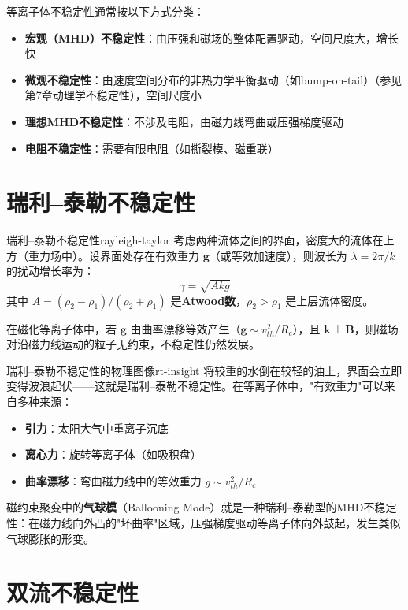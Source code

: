\documentclass[12pt,a4paper,openany,oneside]{book}
\newcommand{\vect}[1]{\bm{#1}}
\newcommand{\difficulty}[1]{\marginnote{\hfill\textcolor{coverMid!80}{\rule[-0.1em]{2pt}{0.9em}}\,\textcolor{coverMid}{\footnotesize\textbf{[#1]}}}}
\begin{document}
等离子体不稳定性通常按以下方式分类：
\begin{itemize}
\item \textbf{宏观（MHD）不稳定性}：由压强和磁场的整体配置驱动，空间尺度大，增长快
\item \textbf{微观不稳定性}：由速度空间分布的非热力学平衡驱动（如bump-on-tail）（参见第7章动理学不稳定性），空间尺度小
\item \textbf{理想MHD不稳定性}：不涉及电阻，由磁力线弯曲或压强梯度驱动
\item \textbf{电阻不稳定性}：需要有限电阻（如撕裂模、磁重联）
\end{itemize}

\section{瑞利--泰勒不稳定性}\difficulty{提高}

\begin{theorem}{瑞利--泰勒不稳定性}{rayleigh-taylor}
考虑两种流体之间的界面，密度大的流体在上方（重力场中）。设界面处存在有效重力 $\vect{g}$（或等效加速度），则波长为 $\lambda = 2\pi/k$ 的扰动增长率为：
\[
\gamma = \sqrt{A k g}
\]
其中 $A = (\rho_2 - \rho_1)/(\rho_2 + \rho_1)$ 是\textbf{Atwood数}，$\rho_2 > \rho_1$ 是上层流体密度。

在磁化等离子体中，若 $\vect{g}$ 由曲率漂移等效产生（$\vect{g} \sim v_{th}^2/R_c$），且 $\vect{k}\perp\vect{B}$，则磁场对沿磁力线运动的粒子无约束，不稳定性仍然发展。
\end{theorem}

\begin{insight}{瑞利--泰勒不稳定性的物理图像}{rt-insight}
将较重的水倒在较轻的油上，界面会立即变得波浪起伏——这就是瑞利--泰勒不稳定性。在等离子体中，"有效重力"可以来自多种来源：
\begin{itemize}
\item \textbf{引力}：太阳大气中重离子沉底
\item \textbf{离心力}：旋转等离子体（如吸积盘）
\item \textbf{曲率漂移}：弯曲磁力线中的等效重力 $g \sim v_{th}^2/R_c$
\end{itemize}

磁约束聚变中的\textbf{气球模}（Ballooning Mode）就是一种瑞利--泰勒型的MHD不稳定性：在磁力线向外凸的"坏曲率"区域，压强梯度驱动等离子体向外鼓起，发生类似气球膨胀的形变。
\end{insight}

\section{双流不稳定性}\difficulty{提高}
\end{document}
